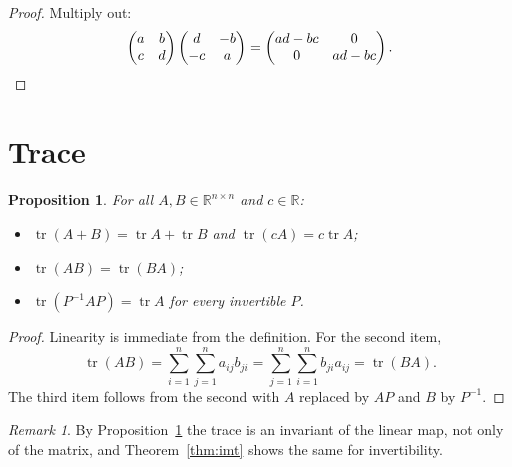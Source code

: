\documentclass{article}
\newtheorem{proposition}[theorem]{Proposition}
\theoremstyle{definition}
\theoremstyle{remark}
\newtheorem{remark}[theorem]{Remark}
\newcommand{\R}{\mathbb{R}}
\DeclareMathOperator{\tr}{tr}
\begin{document}
\begin{proof}
Multiply out:
\[
  \begin{pmatrix} a & b \\ c & d \end{pmatrix}
  \begin{pmatrix} d & -b \\ -c & a \end{pmatrix}
  = \begin{pmatrix} ad - bc & 0 \\ 0 & ad - bc \end{pmatrix}. \qedhere
\]
\end{proof}

\section{Trace}

\begin{proposition}\label{prop:trace}
For all $A, B \in \R^{n \times n}$ and $c \in \R$:
\begin{itemize}
  \item $\tr(A + B) = \tr A + \tr B$ and $\tr(cA) = c \tr A$;
  \item $\tr(AB) = \tr(BA)$;
  \item $\tr(P^{-1}AP) = \tr A$ for every invertible $P$.
\end{itemize}
\end{proposition}

\begin{proof}
Linearity is immediate from the definition. For the second item,
\[
  \tr(AB) = \sum_{i=1}^{n} \sum_{j=1}^{n} a_{ij} b_{ji}
          = \sum_{j=1}^{n} \sum_{i=1}^{n} b_{ji} a_{ij} = \tr(BA).
\]
The third item follows from the second with $A$ replaced by $AP$ and $B$ by
$P^{-1}$.
\end{proof}

\begin{remark}
By Proposition~\ref{prop:trace} the trace is an invariant of the linear map, not only
of the matrix, and Theorem~\ref{thm:imt} shows the same for invertibility.
\end{remark}
\end{document}
